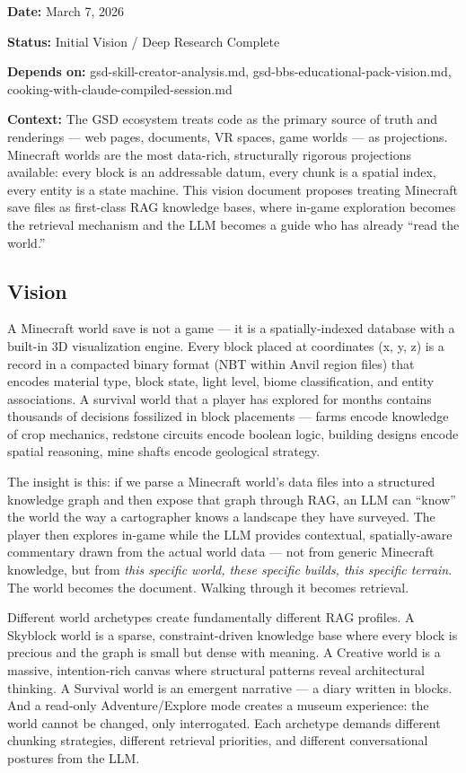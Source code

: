 \documentclass[11pt,letterpaper]{article}
\newcommand{\metafield}[2]{\textbf{\sffamily #1} #2\par}
\begin{document}
\metafield{Date:}{March 7, 2026}
\metafield{Status:}{Initial Vision / Deep Research Complete}
\metafield{Depends on:}{gsd-skill-creator-analysis.md, gsd-bbs-educational-pack-vision.md, cooking-with-claude-compiled-session.md}
\metafield{Context:}{The GSD ecosystem treats code as the primary source of truth and renderings --- web pages, documents, VR spaces, game worlds --- as projections. Minecraft worlds are the most data-rich, structurally rigorous projections available: every block is an addressable datum, every chunk is a spatial index, every entity is a state machine. This vision document proposes treating Minecraft save files as first-class RAG knowledge bases, where in-game exploration becomes the retrieval mechanism and the LLM becomes a guide who has already ``read the world.''}

\subsection{Vision}

A Minecraft world save is not a game --- it is a spatially-indexed database with a built-in 3D visualization engine. Every block placed at coordinates (x, y, z) is a record in a compacted binary format (NBT within Anvil region files) that encodes material type, block state, light level, biome classification, and entity associations. A survival world that a player has explored for months contains thousands of decisions fossilized in block placements --- farms encode knowledge of crop mechanics, redstone circuits encode boolean logic, building designs encode spatial reasoning, mine shafts encode geological strategy.

The insight is this: if we parse a Minecraft world's data files into a structured knowledge graph and then expose that graph through RAG, an LLM can ``know'' the world the way a cartographer knows a landscape they have surveyed. The player then explores in-game while the LLM provides contextual, spatially-aware commentary drawn from the actual world data --- not from generic Minecraft knowledge, but from \textit{this specific world, these specific builds, this specific terrain}. The world becomes the document. Walking through it becomes retrieval.

Different world archetypes create fundamentally different RAG profiles. A Skyblock world is a sparse, constraint-driven knowledge base where every block is precious and the graph is small but dense with meaning. A Creative world is a massive, intention-rich canvas where structural patterns reveal architectural thinking. A Survival world is an emergent narrative --- a diary written in blocks. And a read-only Adventure/Explore mode creates a museum experience: the world cannot be changed, only interrogated. Each archetype demands different chunking strategies, different retrieval priorities, and different conversational postures from the LLM.
\end{document}
